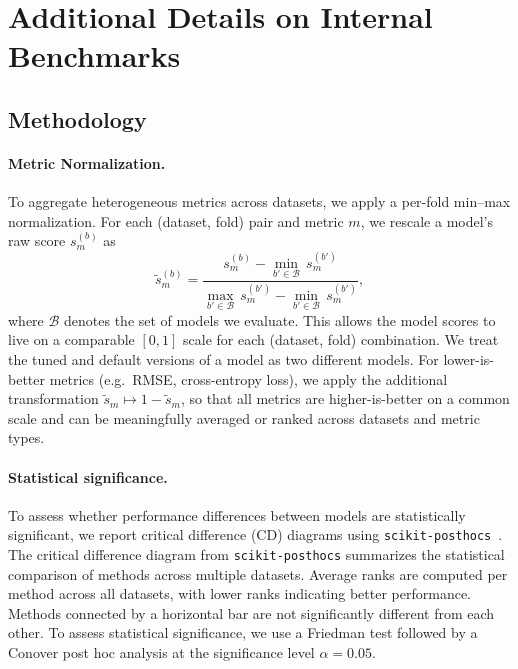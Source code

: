 \section{Additional Details on Internal Benchmarks}

\subsection{Methodology}
\label{app:methodology}

\paragraph{Metric Normalization.}
\label{sec:metric_norm}

To aggregate heterogeneous metrics across datasets, we apply a per-fold min--max normalization.
For each (dataset, fold) pair and metric $m$, we rescale a model's raw score $s_m^{(b)}$ as
\begin{equation}
    \tilde{s}_m^{(b)} = \frac{s_m^{(b)} - \min_{b' \in \mathcal{B}}\, s_m^{(b')}}{\max_{b' \in \mathcal{B}}\, s_m^{(b')} - \min_{b' \in \mathcal{B}}\, s_m^{(b')}},
\end{equation}
where $\mathcal{B}$ denotes the set of models we evaluate. This allows the model scores to live on a comparable $[0, 1]$ scale for each (dataset, fold) combination. We treat the tuned and default versions of a model as two different models.
For lower-is-better metrics (e.g.\ RMSE, cross-entropy loss), we apply the additional transformation $\tilde{s}_m \mapsto 1 - \tilde{s}_m$, so that all metrics are higher-is-better on a common scale and can be meaningfully averaged or ranked across datasets and metric types.

\paragraph{Statistical significance.}
\label{sec:statistical_significance}

To assess whether performance differences between models are statistically significant, we report critical difference (CD) diagrams using \texttt{scikit-posthocs}~\citep{scikit_posthocs_Terpilowski2019}.
The critical difference diagram from \texttt{scikit-posthocs} summarizes the statistical comparison of methods across multiple datasets. Average ranks are computed per method across all datasets, with lower ranks indicating better performance. 
Methods connected by a horizontal bar are not significantly different from each other.
To assess statistical significance, we use a Friedman test followed by a Conover post hoc analysis at the significance level $\alpha=0.05$. 



